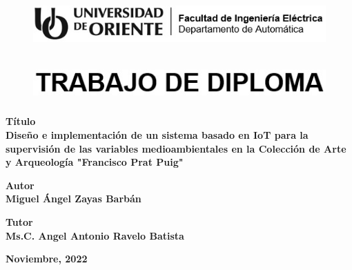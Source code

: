 \thispagestyle{empty}


\begin{figure}[h]
    \centering
    \includegraphics[width=15cm, height=2cm]{imagenes/identidad en blanco y negro.jpg}
\end{figure}

\vspace{1cm}

\begin{figure}[h]
    \centering
    \includegraphics[width=14cm, height=1.5cm]{imagenes/trabajo de diploma}
\end{figure}

\vspace{1cm}

\begin{center}
    \textbf{\large
        Título\\
        Diseño e implementación de un sistema basado en IoT para la supervisión de las variables medioambientales en la Colección de Arte y Arqueología "Francisco Prat Puig"}
    \vspace{0.5cm}

    \textbf{\large Autor\\
    Miguel Ángel Zayas Barbán}
    \vspace{0.5cm}

    \textbf{\large Tutor\\
    Ms.C. Angel Antonio Ravelo Batista}

    \vfill
    \textbf{\large Noviembre, 2022}   
\end{center}

 
